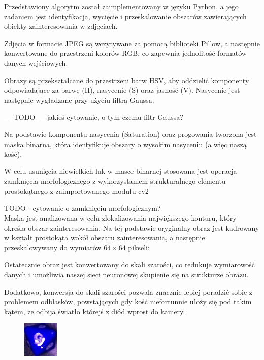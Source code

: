 Przedstawiony algorytm został zaimplementowany w języku Python, a jego zadaniem jest identyfikacja, wycięcie i przeskalowanie obszarów zawierających obiekty zainteresowania w zdjęciach.

Zdjęcia w formacie JPEG są wczytywane za pomocą biblioteki Pillow, a następnie konwertowane do przestrzeni kolorów RGB, co zapewnia jednolitość formatów danych wejściowych.

Obrazy są przekształcane do przestrzeni barw HSV, aby oddzielić komponenty odpowiadające za barwę (H), nasycenie (S) oraz jasność (V).
Nasycenie jest następnie wygładzane przy użyciu filtra Gaussa:

--- TODO ---
jakieś cytowanie, o tym czemu filtr Gaussa?

Na podstawie komponentu nasycenia (Saturation) oraz progowania tworzona jest maska binarna, która identyfikuje obszary o wysokim nasyceniu (a więc naszą kość).

W celu usunięcia niewielkich luk w masce binarnej stosowana jest operacja zamknięcia morfologicznego z wykorzystaniem strukturalnego elementu prostokątnego z zaimportowanego modułu cv2

TODO - cytowanie o zamknięciu morfologicznym?  \\

Maska jest analizowana w celu zlokalizowania największego konturu, który określa obszar zainteresowania.
Na tej podstawie oryginalny obraz jest kadrowany w kształt prostokąta wokół obszaru zainteresowania,
a następnie przeskalowywany do wymiarów $64 \times 64$ pikseli:

Ostatecznie obraz jest konwertowany do skali szarości, co redukuje wymiarowość danych
i umożliwia naszej sieci neuronowej skupienie się na strukturze obrazu.

Dodatkowo, konwersja do skali szarości pozwala znacznie lepiej poradzić sobie z problemem odblasków,
powstających gdy kość niefortunnie ułoży się pod takim kątem, że odbija światło którejś z diód wprost do kamery.


\begin{figure}[H]
    \centering
    \includegraphics[width=0.25\linewidth]{chapters/04-czytanie/figures/blask_raw}
    \caption{}
    \label{fig:blaskraw}
\end{figure}


